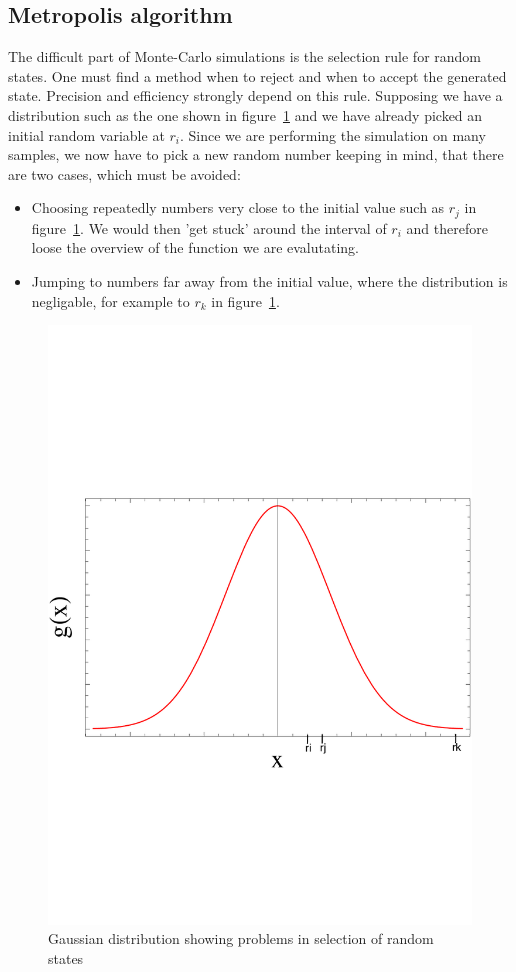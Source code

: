 \subsection{Metropolis algorithm}\label{sec:metropolis}
The difficult part of Monte-Carlo simulations is the selection rule for random states. One must find a method when to reject and when to accept the generated state. Precision and efficiency strongly depend on this rule. Supposing we have a distribution such as the one shown in figure~\ref{fig:distribution} and we have already picked an initial random variable at $r_i$. Since we are performing the simulation on many samples, we now have to pick a new random number keeping in mind, that there are two cases, which must be avoided:
\begin{itemize}
\item Choosing repeatedly numbers very close to the initial value such as $r_j$ in figure~\ref{fig:distribution}. We would then 'get stuck' around the interval of $r_i$ and therefore loose the overview of the function we are evalutating.
\item Jumping to numbers far away from the initial value, where the distribution is negligable, for example to $r_k$ in figure~\ref{fig:distribution}. 
\end{itemize}
\begin{figure}
    \centering
    \includegraphics[scale=0.35]{distribution}
    \caption{Gaussian distribution showing problems in selection of random states}
    \label{fig:distribution}
\end{figure}
